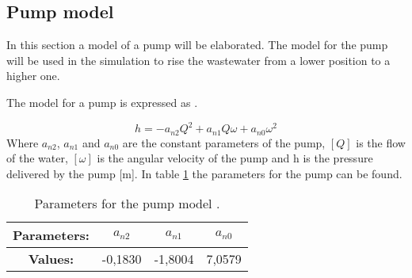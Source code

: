 \subsection{Pump model}\label{se:pump_model}
In this section a model of a pump will be elaborated. The model for the pump will be used in the simulation to rise the wastewater from a lower position to a higher one. 

 The model for a pump is expressed as \cite{kallesoe_pump}.

\begin{equation}\label{sec:eq_pump_exp}
h= -a_{n2}Q^2+a_{n1}Q\omega+a_{n0}\omega^2
\end{equation}
Where $a_{n2}$, $a_{n1}$ and $a_{n0}$ are the constant parameters of the pump, $[Q]$ is the flow of the water, $[\omega]$ is the angular velocity of the pump and h is the pressure delivered by the pump [m]. In table \ref{tab:pump_parameters} the parameters for the pump can be found.

\begin{table}[H]
\centering
\begin{tabular}{|c|c|c|c|}
\hline
\rowcolor[HTML]{9B9B9B} 
\textbf{Parameters:}                     & \textbf{$a_{n2}$} & \textbf{$a_{n1}$} & \textbf{$a_{n0}$} \\ \hline
\cellcolor[HTML]{9B9B9B}\textbf{Values:} & -0,1830           & -1,8004            & 7,0579              \\ \hline
\end{tabular}
\caption{Parameters for the pump model \cite{kallesoe_pump}.}
\label{tab:pump_parameters}
\end{table}